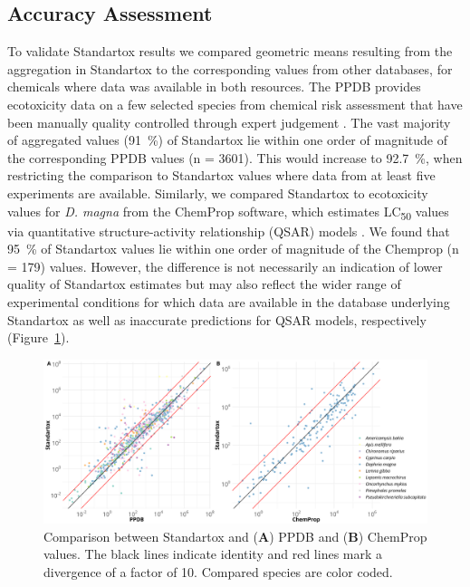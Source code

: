 \documentclass[journal,datadescriptor,accept,moreauthors,pdftex]{Definitions/mdpi}
\begin{document}
\subsection{Accuracy Assessment}
To validate Standartox results we compared geometric means resulting from the aggregation in Standartox to the corresponding values from other databases, for chemicals where data was available in both resources. The PPDB provides ecotoxicity data on a few selected species from chemical risk assessment that have been manually quality controlled through expert judgement \citep{lewis_international_2016}. The vast majority of aggregated values (91~\%) of Standartox lie within one order of magnitude of the corresponding PPDB values (n = 3601). This would increase to 92.7~\%, when restricting the comparison to Standartox values where data from at least five experiments are available. Similarly, we compared Standartox to ecotoxicity values for \textit{D. magna} from the ChemProp \citep{ufzdepartmentofecologicalchemistry_chemprop_2019} software, which estimates LC\textsubscript{50} values via quantitative structure-activity relationship (QSAR) models \citep{schuurmann_quantitative_2011}. We found that 95~\% of Standartox values lie within one order of magnitude of the Chemprop (n = 179) values. However, the diﬀerence is not necessarily an indication of lower quality of Standartox estimates but may also reflect the wider range of experimental conditions for which data are available in the database underlying Standartox as well as inaccurate predictions for QSAR models, respectively (Figure~\ref{fig:standartox_ppdb_diff}).

\begin{figure}[H]
    \centering
    \includegraphics[width=1\linewidth]{article/figures/gg_ppdb_stan_compare_continous.png}
    \caption{Comparison between Standartox and (\textbf{A}) PPDB and (\textbf{B}) ChemProp values. The black lines indicate identity and red lines mark a divergence of a factor of 10. Compared species are color coded.}
    \label{fig:standartox_ppdb_diff}
\end{figure}
\end{document}
